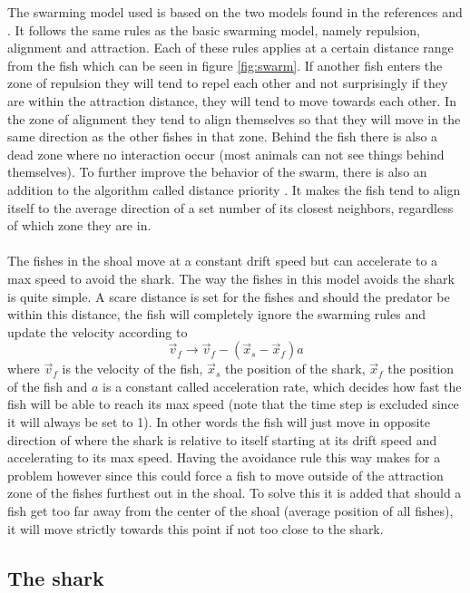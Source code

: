 The swarming model used is based on the two models found in the references \cite{javafish} and \cite{matlabfish}. It follows the same rules as the basic swarming model, namely repulsion, alignment and attraction. Each of these rules applies at a certain distance range from the fish which can be seen in figure \ref{fig:swarm}. If another fish enters the zone of repulsion they will tend to repel each other and not surprisingly if they are within the attraction distance, they will tend to move towards each other. In the zone of alignment they tend to align themselves so that they will move in the same direction as the other fishes in that zone. Behind the fish there is also a dead zone where no interaction occur (most animals can not see things behind themselves). To further improve the behavior of the swarm, there is also an addition to the algorithm called distance priority \cite{matlabfish}. It makes the fish tend to align itself to the average direction of a set number of its closest neighbors, regardless of which zone they are in.\\
\\
The fishes in the shoal move at a constant drift speed but can accelerate to a max speed to avoid the shark. The way the fishes in this model avoids the shark is quite simple. A scare distance is set for the fishes and should the predator be within this distance, the fish will completely ignore the swarming rules and update the velocity according to
\begin{equation}
\vec{v}_f \rightarrow \vec{v}_f - (\vec{x}_s - \vec{x}_f)a
\end{equation}
where $\vec{v}_f$ is the velocity of the fish, $\vec{x}_s$ the position of the shark, $\vec{x}_f$ the position of the fish and $a$ is a constant called acceleration rate, which decides how fast the fish will be able to reach its max speed (note that the time step is excluded since it will always be set to 1). In other words the fish will just move in opposite direction of where the shark is relative to itself starting at its drift speed and accelerating to its max speed. Having the avoidance rule this way makes for a problem however since this could force a fish to move outside of the attraction zone of the fishes furthest out in the shoal. To solve this it is added that should a fish get too far away from the center of the shoal (average position of all fishes), it will move strictly towards this point if not too close to the shark.

\subsection{The shark}

